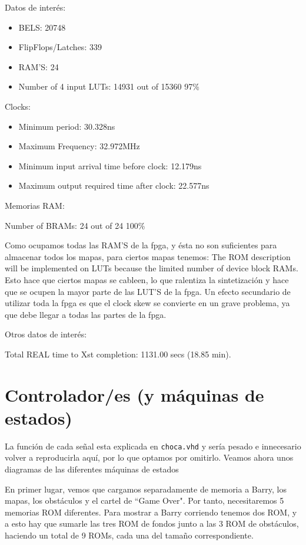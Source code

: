 \documentclass[11pt, a4paper, spanish, openright, twoside]{book}
\begin{document}
	Datos de interés:
	\begin{itemize}
	\item BELS: 20748
	\item FlipFlops/Latches: 339
	\item RAM'S: 24
	\item  Number of 4 input LUTs:  14931  out of  15360    97\%  


\end{itemize}
	Clocks:
	\begin{itemize}
	\item  Minimum period: 30.328ns 
	\item 	Maximum Frequency: 32.972MHz
 	\item  Minimum input arrival time before clock: 12.179ns
   	\item Maximum output required time after clock: 22.577ns

\end{itemize}
	Memorias RAM:
	
	Number of BRAMs:    24  out of     24   100\%  

	Como ocupamos todas las RAM'S de la fpga, y ésta no son suficientes para almacenar todos los mapas, para ciertos mapas tenemos:
		The ROM description  will be implemented on LUTs because the limited number of device block RAMs.
	Esto hace que ciertos mapas se cableen, lo que ralentiza la sintetización y hace que se ocupen la mayor parte de las LUT'S de la fpga.
	Un efecto secundario de utilizar toda la fpga es que el clock skew se convierte en un grave problema, ya que debe llegar a todas 
	 las partes de la fpga.

	Otros datos de interés:
	
	Total REAL time to Xst completion: 1131.00 secs (18.85 min).

\section{Controlador/es (y máquinas de estados)}
La función de cada señal esta explicada en \texttt{choca.vhd} y sería pesado e innecesario volver a reproducirla aquí, por lo que optamos por omitirlo.
Veamos ahora unos diagramas de las diferentes máquinas de estados

En primer lugar, vemos que cargamos separadamente de memoria a Barry,  los mapas, los obstáculos y el cartel de ``Game Over". Por tanto, necesitaremos 5 memorias ROM diferentes. Para mostrar a Barry corriendo tenemos dos ROM, y a esto hay que sumarle las tres ROM de fondos junto a las 3 ROM de obstáculos, haciendo un total de 9 ROMs, cada una del tamaño correspondiente. 
\end{document}
